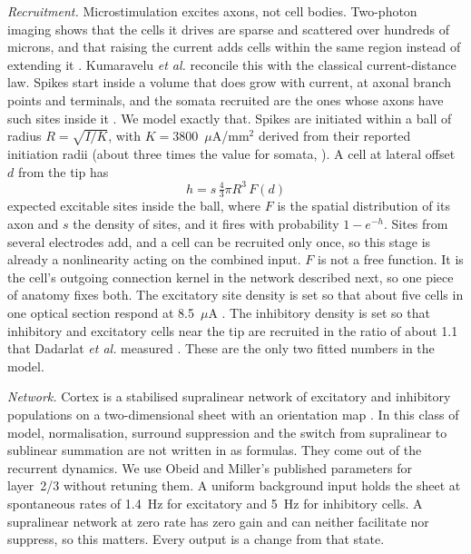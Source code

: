 \documentclass[10pt,twocolumn]{article}
\newcommand{\uA}{\ensuremath{\mu\text{A}}}
\begin{document}
\textit{Recruitment.} Microstimulation excites axons, not cell bodies.
Two-photon imaging shows that the cells it drives are sparse and scattered
over hundreds of microns, and that raising the current adds cells within
the same region instead of extending it \citep{histed2009}. Kumaravelu
\textit{et al.} reconcile this with the classical current-distance law.
Spikes start inside a volume that does grow with current, at axonal branch
points and terminals, and the somata recruited are the ones whose axons
have such sites inside it \citep{kumaravelu2022}. We model exactly that.
Spikes are initiated within a ball of radius $R=\sqrt{I/K}$, with
$K = 3800$~\uA/mm$^2$ derived from their reported initiation radii (about
three times the value for somata, \citealp{stoney1968}). A cell at lateral
offset $d$ from the tip has
\begin{equation}
  h = s\,\tfrac{4}{3}\pi R^3\,F(d)
\end{equation}
expected excitable sites inside the ball, where $F$ is the spatial
distribution of its axon and $s$ the density of sites, and it fires with
probability $1-e^{-h}$. Sites from several electrodes add, and a cell can
be recruited only once, so this stage is already a nonlinearity acting on
the combined input. $F$ is not a free function. It is the cell's outgoing
connection kernel in the network described next, so one piece of anatomy
fixes both. The excitatory site density is set so that about five cells in
one optical section respond at 8.5~\uA{} \citep{histed2009}. The
inhibitory density is set so that inhibitory and excitatory cells near the
tip are recruited in the ratio of about 1.1 that Dadarlat \textit{et al.}
measured \citep{dadarlat2024}. These are the only two fitted numbers in
the model.

\textit{Network.} Cortex is a stabilised supralinear network of excitatory
and inhibitory populations on a two-dimensional sheet with an orientation
map \citep{ahmadian2013,rubin2015}. In this class of model, normalisation,
surround suppression and the switch from supralinear to sublinear summation
are not written in as formulas. They come out of the recurrent dynamics. We
use Obeid and Miller's published parameters for layer~2/3
\citep{obeid2025} without retuning them. A uniform background input holds
the sheet at spontaneous rates of 1.4~Hz for excitatory and 5~Hz for
inhibitory cells. A supralinear network at zero rate has zero gain and can
neither facilitate nor suppress, so this matters. Every output is a change
from that state.
\end{document}
